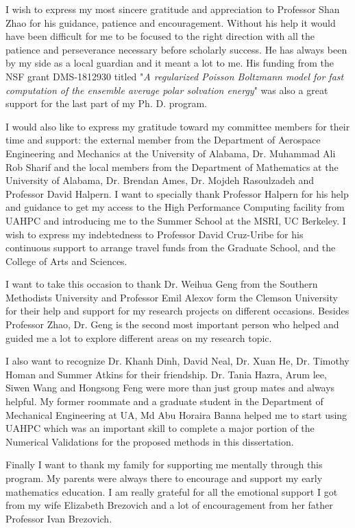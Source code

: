 I wish to express my most sincere gratitude and appreciation to Professor Shan Zhao for his guidance, patience and encouragement. Without his help it would have been difficult for me to be focused to the right direction with all the patience and perseverance necessary before scholarly success. He has always been by my side as a local guardian and it meant a lot to me.  His funding from the NSF grant DMS-1812930 titled "{\it A regularized Poisson Boltzmann model for fast computation of the ensemble average polar solvation energy}" was also a great support for the last part of my Ph. D. program. 

I would also like to express my gratitude toward my committee members for their time and support: the external member from the Department of Aerospace Engineering and Mechanics at the University of Alabama, Dr. Muhammad Ali Rob Sharif and the local members from the Department of Mathematics at the University of Alabama, Dr. Brendan Ames, Dr. Mojdeh Rasoulzadeh and Professor David Halpern. I want to specially thank Professor Halpern for his help and guidance to get my access to the High Performance Computing facility from UAHPC and introducing me to the Summer School at the MSRI, UC Berkeley. I wish to express my indebtedness to Professor David Cruz-Uribe for his continuous support to arrange travel funds from the Graduate School, and the College of Arts and Sciences. 

I want to take this occasion to thank Dr. Weihua Geng from the Southern Methodists University and Professor Emil Alexov form the Clemson University for their help and support for my research projects on different occasions. Besides Professor Zhao, Dr. Geng is the second most important person who helped and guided me a lot to explore different areas on my research topic. 

I also want to recognize Dr. Khanh Dinh, David Neal, Dr. Xuan He, Dr. Timothy Homan and Summer Atkins for their friendship. Dr. Tania Hazra, Arum lee, Siwen Wang and Hongsong Feng were more than just group mates and always helpful. My former  roommate and a graduate student in the Department of Mechanical Engineering at UA, Md Abu Horaira Banna helped me to start using UAHPC which was an important skill to complete a major portion of the Numerical Validations for the proposed methods in this dissertation. 

Finally I want to thank my family for supporting me mentally through this program. My parents were always there to encourage and support my early mathematics education. I am really grateful for all the emotional support I got from my wife Elizabeth Brezovich and a lot of encouragement from her father Professor Ivan Brezovich.

